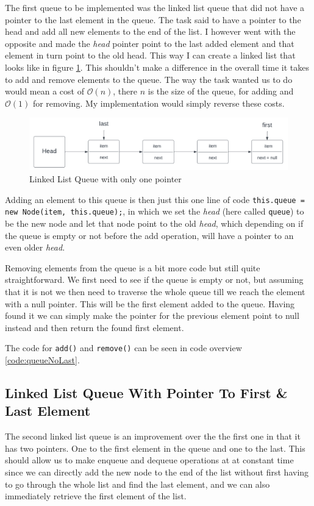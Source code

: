 \documentclass[a4paper,11pt]{article}
\begin{document}
The first queue to be implemented was the linked list queue that did not have a pointer to the last element in the queue. The task
said to have a pointer to the head and add all new elements to the end of the list. I however went with the opposite and made the \textit{head}
pointer point to the last added element and that element in turn point to the old head. This way I can create a linked list that looks like in
figure \ref{fig:queueNoLast}. This shouldn't make a difference in the overall time it takes to add and remove elements to the queue. The way the task wanted
us to do would mean a cost of $\mathcal{O}(n)$, there $n$ is the size of the queue, for adding and $\mathcal{O}(1)$ for removing. My implementation would
simply reverse these costs.
\begin{figure}[h!]
    \centering
    \includegraphics[width=.9\textwidth]{queue-no-last.pdf}
    \caption{Linked List Queue with only one pointer}
    \label{fig:queueNoLast}
\end{figure}

Adding an element to this queue is then just this one line of code {\tt this.queue = new Node(item, this.queue);}, in which we set the \textit{head} (here
called {\tt queue}) to be the new node and let that node point to the old \textit{head}, which depending on if the queue is empty or not before the add operation,
will have a pointer to an even older \textit{head}.

Removing elements from the queue is a bit more code but still quite straightforward. We first need to see if the queue is empty or not, but assuming that it is not
we then need to traverse the whole queue till we reach the element with a null pointer. This will be the first element added to the queue. Having found it we can
simply make the pointer for the previous element point to null instead and then return the found first element.

The code for {\tt add()} and {\tt remove()} can be seen in code overview \ref{code:queueNoLast}.

\subsection{Linked List Queue With Pointer To First \& Last Element}
\label{met-linkedQueue}
The second linked list queue is an improvement over the the first one in that it has two pointers. One to the first element in the queue and one to the last.
This should allow us to make enqueue and dequeue operations at at constant time since we can directly add the new node to the end of the list without first having
to go through the whole list and find the last element, and we can also immediately retrieve the first element of the list.
\end{document}
